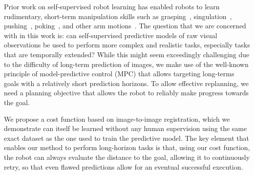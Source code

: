 Prior work on self-supervised robot learning has enabled robots to learn rudimentary, short-term manipulation skills such as grasping~\cite{lerrel,google_handeye}, singulation~\cite{princeton_pushgrasp}, pushing~\cite{foresight,sna}, poking~\cite{pulkit}, and other arm motions~\cite{se3_control}. The question that we are concerned with in this work is: can self-supervised predictive models of raw visual observations be used to perform more complex and realistic tasks, especially tasks that are temporally extended? 
While this might seem exceedingly challenging due to the difficulty of long-term prediction of images, we make use of the well-known principle of model-predictive control (MPC) that allows targeting long-terms goals with a relatively short prediction horizons. To allow effective replanning, we need a planning objective that allows the robot to reliably make progress towards the goal.

We propose a cost function based on image-to-image registration, which we demonstrate can itself be learned without any human supervision using the same exact dataset as the one used to train the predictive model. The key element that enables our method to perform long-horizon tasks is that, using our cost function, the robot can always evaluate the distance to the goal, allowing it to continuously retry, so that even flawed predictions allow for an eventual successful execution. 




